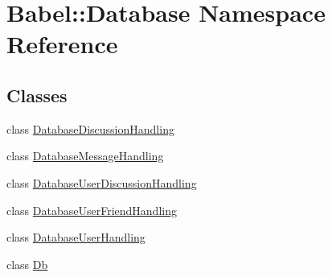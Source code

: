 \hypertarget{namespaceBabel_1_1Database}{}\section{Babel\+:\+:Database Namespace Reference}
\label{namespaceBabel_1_1Database}
\subsection*{Classes}
\begin{DoxyCompactItemize}
\item 
class \hyperlink{classBabel_1_1Database_1_1DatabaseDiscussionHandling}{Database\+Discussion\+Handling}
\item 
class \hyperlink{classBabel_1_1Database_1_1DatabaseMessageHandling}{Database\+Message\+Handling}
\item 
class \hyperlink{classBabel_1_1Database_1_1DatabaseUserDiscussionHandling}{Database\+User\+Discussion\+Handling}
\item 
class \hyperlink{classBabel_1_1Database_1_1DatabaseUserFriendHandling}{Database\+User\+Friend\+Handling}
\item 
class \hyperlink{classBabel_1_1Database_1_1DatabaseUserHandling}{Database\+User\+Handling}
\item 
class \hyperlink{classBabel_1_1Database_1_1Db}{Db}
\end{DoxyCompactItemize}
